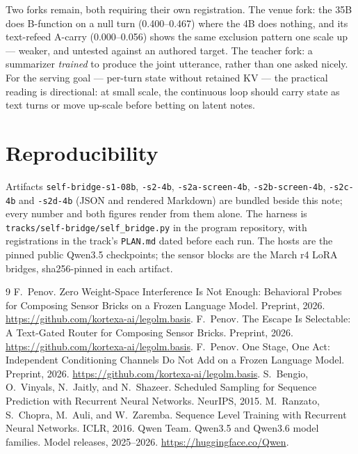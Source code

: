 \documentclass[11pt]{article}
\begin{document}
Two forks remain, both requiring their own registration.  The venue fork:
the 35B does B-function on a null turn (0.400--0.467) where the 4B does
nothing, and its text-refeed A-carry (0.000--0.056) shows the same exclusion
pattern one scale up --- weaker, and untested against an authored target.
The teacher fork: a summarizer \emph{trained} to produce the joint
utterance, rather than one asked nicely.  For the serving goal --- per-turn
state without retained KV --- the practical reading is directional: at
small scale, the continuous loop should carry state as text turns or move
up-scale before betting on latent notes.

\section{Reproducibility}

Artifacts \texttt{self-bridge-s1-08b}, \texttt{-s2-4b},
\texttt{-s2a-screen-4b}, \texttt{-s2b-screen-4b}, \texttt{-s2c-4b} and
\texttt{-s2d-4b} (JSON and rendered Markdown) are bundled beside this
note; every number and both figures render from them alone.  The harness is
\texttt{tracks/self-bridge/self\_bridge.py} in the program repository,
with registrations in the track's \texttt{PLAN.md} dated before each run.
The hosts are the pinned public Qwen3.5 checkpoints; the sensor blocks are
the March r4 LoRA bridges, sha256-pinned in each artifact.

\begin{thebibliography}{9}
 F.~Penov. Zero Weight-Space Interference
Is Not Enough: Behavioral Probes for Composing Sensor Bricks on a Frozen
Language Model. Preprint, 2026.
\url{https://github.com/kortexa-ai/legolm.basis}.
 F.~Penov. The Escape Is Selectable: A
Text-Gated Router for Composing Sensor Bricks. Preprint, 2026.
\url{https://github.com/kortexa-ai/legolm.basis}.
 F.~Penov. One Stage, One Act: Independent
Conditioning Channels Do Not Add on a Frozen Language Model. Preprint,
2026. \url{https://github.com/kortexa-ai/legolm.basis}.
 S.~Bengio, O.~Vinyals, N.~Jaitly, and
N.~Shazeer. Scheduled Sampling for Sequence Prediction with Recurrent
Neural Networks. NeurIPS, 2015.
 M.~Ranzato, S.~Chopra, M.~Auli, and
W.~Zaremba. Sequence Level Training with Recurrent Neural Networks. ICLR,
2016.
 Qwen Team. Qwen3.5 and Qwen3.6 model families. Model
releases, 2025--2026. \url{https://huggingface.co/Qwen}.
\end{thebibliography}
\end{document}
